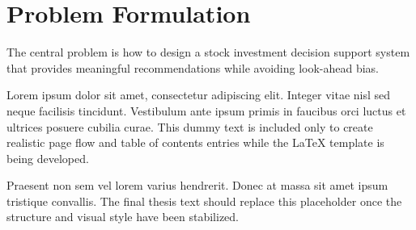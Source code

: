 \section{Problem Formulation}

The central problem is how to design a stock investment decision support system that provides meaningful recommendations while avoiding look-ahead bias.

Lorem ipsum dolor sit amet, consectetur adipiscing elit. Integer vitae nisl sed neque facilisis tincidunt. Vestibulum ante ipsum primis in faucibus orci luctus et ultrices posuere cubilia curae. This dummy text is included only to create realistic page flow and table of contents entries while the LaTeX template is being developed.

Praesent non sem vel lorem varius hendrerit. Donec at massa sit amet ipsum tristique convallis. The final thesis text should replace this placeholder once the structure and visual style have been stabilized.

